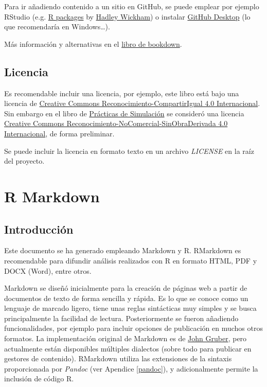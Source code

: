 \documentclass[]{book}
\theoremstyle{definition}
\theoremstyle{definition}
\theoremstyle{definition}
\theoremstyle{remark}
\begin{document}
Para ir añadiendo contenido a un sitio en GitHub, se puede emplear por
ejemplo RStudio (e.g. \href{http://r-pkgs.had.co.nz/git.html}{R
packages} by \href{http://hadley.nz/\#code}{Hadley Wickham}) o instalar
\href{https://desktop.github.com}{GitHub Desktop} (lo que recomendaría
en Windows\ldots{}).

Más información y alternativas en el
\href{https://bookdown.org/yihui/bookdown/publishing.html}{libro de
bookdown}.

\section{Licencia}\label{licencia}

Es recomendable incluir una licencia, por ejemplo, este libro está bajo
una licencia de
\href{https://creativecommons.org/licenses/by-sa/4.0/deed.es}{Creative
Commons Reconocimiento-CompartirIgual 4.0 Internacional}. Sin embargo en
el libro de \href{https://rubenfcasal.github.io/simbook}{Prácticas de
Simulación} se consideró una licencia
\href{https://creativecommons.org/licenses/by-nc-nd/4.0/deed.es_ES}{Creative
Commons Reconocimiento-NoComercial-SinObraDerivada 4.0 Internacional},
de forma preliminar.

Se puede incluir la licencia en formato texto en un archivo
\emph{LICENSE} en la raíz del proyecto.

\appendix


\chapter{R Markdown}\label{rmarkdown}

\section{Introducción}\label{introduccion-1}

Este documento se ha generado empleando Markdown y R. RMarkdown es
recomendable para difundir análisis realizados con R en formato HTML,
PDF y DOCX (Word), entre otros.

Markdown se diseñó inicialmente para la creación de páginas web a partir
de documentos de texto de forma sencilla y rápida. Es lo que se conoce
como un lenguaje de marcado ligero, tiene unas reglas sintácticas muy
simples y se busca principalmente la facilidad de lectura.
Posteriormente se fueron añadiendo funcionalidades, por ejemplo para
incluir opciones de publicación en muchos otros formatos. La
implementación original de Markdown es de
\href{http://daringfireball.net/projects/markdown/}{John Gruber}, pero
actualmente están disponibles múltiples dialectos (sobre todo para
publicar en gestores de contenido). RMarkdown utiliza las extensiones de
la sintaxis proporcionada por \emph{Pandoc} (ver Apendice \ref{pandoc}),
y adicionalmente permite la inclusión de código R.
\end{document}
